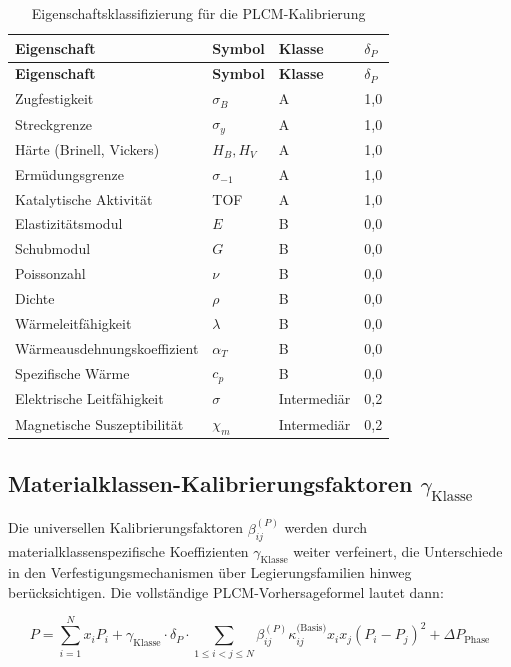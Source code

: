 \documentclass[12pt,a4paper]{article}
\begin{document}
\begin{longtable}{p{4cm}p{3cm}p{3cm}p{3cm}}
	\caption{Eigenschaftsklassifizierung für die PLCM-Kalibrierung} \label{tab:property-classification} \\
	\toprule
	\textbf{Eigenschaft} & \textbf{Symbol} & \textbf{Klasse} & \(\delta_P\) \\
	\midrule
	\endfirsthead
	\toprule
	\textbf{Eigenschaft} & \textbf{Symbol} & \textbf{Klasse} & \(\delta_P\) \\
	\midrule
	\endhead
	Zugfestigkeit & \(\sigma_B\) & A & 1,0 \\
	Streckgrenze & \(\sigma_y\) & A & 1,0 \\
	Härte (Brinell, Vickers) & \(H_B, H_V\) & A & 1,0 \\
	Ermüdungsgrenze & \(\sigma_{-1}\) & A & 1,0 \\
	Katalytische Aktivität & TOF & A & 1,0 \\
	\hline
	Elastizitätsmodul & \(E\) & B & 0,0 \\
	Schubmodul & \(G\) & B & 0,0 \\
	Poissonzahl & \(\nu\) & B & 0,0 \\
	Dichte & \(\rho\) & B & 0,0 \\
	Wärmeleitfähigkeit & \(\lambda\) & B & 0,0 \\
	Wärmeausdehnungskoeffizient & \(\alpha_T\) & B & 0,0 \\
	Spezifische Wärme & \(c_p\) & B & 0,0 \\
	\hline
	Elektrische Leitfähigkeit & \(\sigma\) & Intermediär & 0,2 \\
	Magnetische Suszeptibilität & \(\chi_m\) & Intermediär & 0,2 \\
	\bottomrule
\end{longtable}

\subsection{Materialklassen-Kalibrierungsfaktoren \(\gamma_{\text{Klasse}}\)}
\label{subsec:material-class-factors}

Die universellen Kalibrierungsfaktoren \(\beta_{ij}^{(P)}\) werden durch materialklassenspezifische Koeffizienten \(\gamma_{\text{Klasse}}\) weiter verfeinert, die Unterschiede in den Verfestigungsmechanismen über Legierungsfamilien hinweg berücksichtigen. Die vollständige PLCM-Vorhersageformel lautet dann:

\begin{equation}
	\boxed{P = \sum_{i=1}^{N} x_i P_i + \gamma_{\text{Klasse}} \cdot \delta_P \cdot \sum_{1\le i<j\le N} \beta_{ij}^{(P)} \kappa_{ij}^{\text{(Basis)}} x_i x_j (P_i - P_j)^2 + \Delta P_{\text{Phase}}}
	\label{eq:plcm-full-calibration}
\end{equation}
\end{document}
